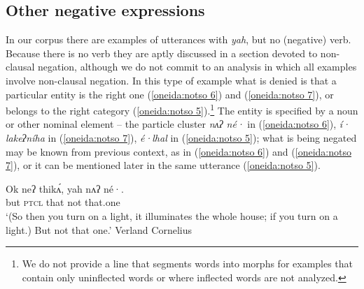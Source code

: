 \documentclass[output=paper,colorlinks,citecolor=brown]{langscibook}
\begin{document}

\subsection{Other negative expressions}
\label{oneida:sec:other non-clausal}

In our corpus there are examples of utterances with \textit{yah}, but no  (negative) verb. Because there is no verb they are aptly discussed in a section devoted to non-clausal negation, although we do not commit to an analysis in which all examples involve non-clausal negation. In this type of example what is denied is that a particular entity is the right one (\ref{oneida:notso 6}) and (\ref{oneida:notso 7}), or belongs to the right category (\ref{oneida:notso 5}).\footnote{We do not provide a line that segments words into morphs for examples that contain only uninflected words or where inflected words are not analyzed.} The entity is specified by a noun or other nominal element -- the particle cluster \textit{nʌʔ né·} in (\ref{oneida:notso 6}), \textit{í· lakeʔníha} in (\ref{oneida:notso 7}), \textit{é·lhal} in (\ref{oneida:notso 5}); what is being negated may be known from previous context, as in (\ref{oneida:notso 6}) and (\ref{oneida:notso 7}), or it can be mentioned later in the same utterance (\ref{oneida:notso 5}).

\ea\label{oneida:notso 6}
    \gll Ok neʔ thikʌ́, yah  {nʌʔ né·}. \\
    but \textsc{ptcl} that not {that.one} \\
    \glt `(So then you turn on a light, it illuminates the whole house; if you turn on a light.) But not that one.' Verland Cornelius \citep[112 (17)]{MichelsonEtAl2016}
\z  
\end{document}

